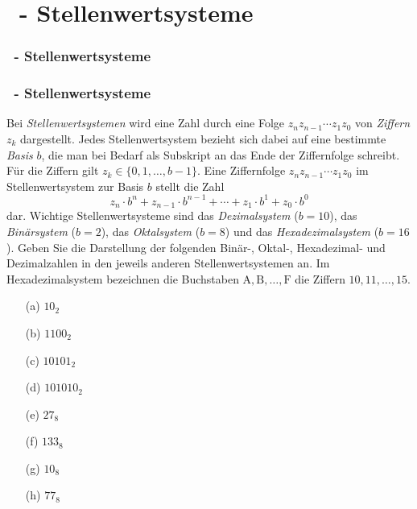 \def\stitle{\theexercise\ - Stellenwertsysteme}
\section{\stitle}
\begin{frame}%
  \frametitle{\stitle}%
\tableofcontents[current]
\end{frame}


\begin{frame}[t]%
  \frametitle{\stitle}%


Bei \emph{Stellenwertsystemen} wird eine Zahl durch eine Folge ${z_n z_{n-1} \dotsb z_1 z_0}$ von \emph{Ziffern} $z_k$ dargestellt.
Jedes Stellenwertsystem bezieht sich dabei auf eine bestimmte \emph{Basis} $b$, die man bei Bedarf als Subskript an das Ende der Ziffernfolge schreibt.
Für die Ziffern gilt $z_k \in \{0,1,\dotsc,b-1\}$.
Eine Ziffernfolge ${z_n z_{n-1} \dotsb z_1 z_0}$ im Stellenwertsystem zur Basis $b$ stellt die Zahl
\[  z_n \cdot b^{n} + z_{n-1} \cdot b^{n-1} + \dotsb + z_1 \cdot b^1 + z_0 \cdot b^0  \]
dar.
Wichtige Stellenwertsysteme sind das \emph{Dezimalsystem} ($b = 10$), das \emph{Binärsystem} ($b = 2$), das \emph{Oktalsystem} ($b = 8$) und das \emph{Hexadezimalsystem} ($b = 16$).
Geben Sie die Darstellung der folgenden  Binär-, Oktal-, Hexadezimal- und Dezimalzahlen in den jeweils anderen Stellenwertsystemen an.
Im Hexadezimalsystem bezeichnen die Buchstaben $\mathrm{A},\mathrm{B}, \dotsc, \mathrm{F}$ die Ziffern $10, 11, \dotsc, 15$.
\begin{center}
\begin{minipage}{0.22\textwidth}
\begin{enumerate}
\item[(a)] $10_2$
\item[(b)] $1100_2$
\item[(c)] $10101_2$
\item[(d)] $101010_2$
\end{enumerate}
\end{minipage}
\begin{minipage}{0.22\textwidth}
\begin{enumerate}
\item[(e)] $27_8$
\item[(f)] $133_8$
\item[(g)] $10_8$
\item[(h)] $77_8$
\end{enumerate}
\end{minipage}
\begin{minipage}{0.22\textwidth}

\end{minipage}
\end{center}
\end{frame}
